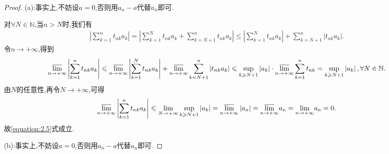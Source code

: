 \documentclass[../../main.tex]{subfiles}%
\begin{document}
\begin{proof}

(a):事实上,不妨设$a=0$,否则用$a_n-a$代替$a_n$即可.

对$\forall N\in\mathbb{N}$,当$n>N$时,我们有
\begin{align*}
\left| \sum\limits_{k=1}^n{t_{nk}a_k} \right|=\left| \sum\limits_{k=1}^N{t_{nk}a_k}+\sum\limits_{k=N+1}^n{t_{nk}a_k} \right|\leqslant \left| \sum\limits_{k=1}^N{t_{nk}a_k} \right|+\sum\limits_{k=N+1}^n{\left| t_{nk}a_k \right|}.
\end{align*}
令$n\to+\infty$,得到
\begin{align*}
\underset{n\rightarrow +\infty}{{\varlimsup }}\left| \sum\limits_{k=1}^n{t_{nk}a_k} \right|\leqslant \underset{n\rightarrow +\infty}{{\varlimsup }}\left| \sum\limits_{k=1}^N{t_{nk}a_k} \right|+\underset{n\rightarrow +\infty}{{\varlimsup }}\sum\limits_{k=N+1}^n{\left| t_{nk}a_k \right|}\leqslant \mathop {\mathrm{sup}} \limits_{k\geqslant N+1}\left| a_k \right|\cdot \underset{n\rightarrow +\infty}{{\varlimsup }}\sum\limits_{k=1}^n{t_{nk}}=\mathop {\mathrm{sup}} \limits_{k\geqslant N+1}\left| a_k \right|,\forall N\in \mathbb{N} .
\end{align*}
由$N$的任意性,再令$N\to+\infty$,可得
\begin{align*}
\underset{n\rightarrow +\infty}{{\varlimsup }}\left| \sum\limits_{k=1}^n{t_{nk}a_k} \right|\leqslant \underset{N\rightarrow +\infty}{\lim}\mathop {\mathrm{sup}} \limits_{k\geqslant N+1}\left| a_k \right|=\underset{n\rightarrow +\infty}{{\varlimsup }}\left| a_n \right|=\underset{n\rightarrow +\infty}{{\varlimsup }}a_n=\underset{n\rightarrow +\infty}{\lim}a_n=0.
\end{align*}
故\eqref{equation:2.5}式成立.

(b):事实上,不妨设$a=0$,否则用$a_n-a$代替$a_n$即可.


\end{proof}
\end{document}

